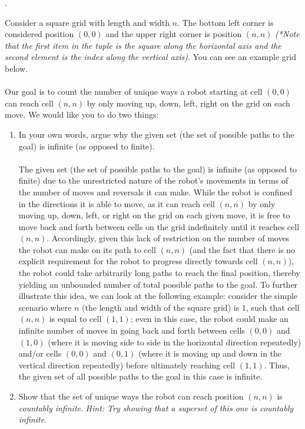 \documentclass[12pt]{article}
\newcounter{quesnum}
\newcommand{\question}[2][??]{
\begin{list}{\labelitemi}{\leftmargin=2em}
\item [\arabic{quesnum}.] {} {#2}
\end{list}
\addtocounter{quesnum}{1}
}
\begin{document}
\vspace{12pt}



\question[3]{
Consider a square grid with length and width $n$. The bottom left corner is considered position $(0,0)$ and the upper right corner is position $(n,n)$ \emph{(*Note that the first item in the tuple is the square along the horizontal axis and the second element is the index along the vertical axis)}. You can see an example grid below.\\
\\
Our goal is to count the number of unique ways a robot starting at cell $(0,0)$ can reach cell $(n,n)$ by only moving up, down, left, right on the grid on each move. We would like you to do two things:

\begin{enumerate}
	\item In your own words, argue why the given set (the set of possible paths to the goal) is infinite (as opposed to finite).\\
\\
 The given set (the set of possible paths to the goal) is infinite (as opposed to finite) due to the unrestricted nature of the robot's movements in terms of the number of moves and reversals it can make. While the robot is confined in the directions it is able to move, as it can reach cell $(n,n)$ by only moving up, down, left, or right on the grid on each given move, it is free to move back and forth between cells on the grid indefinitely until it reaches cell $(n,n)$. Accordingly, given this lack of restriction on the number of moves the robot can make on its path to cell $(n,n)$ (and the fact that there is no explicit requirement for the robot to progress directly towards cell $(n,n)$), the robot could take arbitrarily long paths to reach the final position, thereby yielding an unbounded number of total possible paths to the goal. To further illustrate this idea, we can look at the following example: consider the simple scenario where $n$ (the length and width of the square grid) is $1$, such that cell $(n,n)$ is equal to cell $(1,1)$; even in this case, the robot could make an infinite number of moves in going back and forth between cells $(0, 0)$ and $(1, 0)$ (where it is moving side to side in the horizontal direction repeatedly) and/or cells $(0, 0)$ and $(0, 1)$ (where it is moving up and down in the vertical direction repeatedly) before ultimately reaching cell $(1,1)$. Thus, the given set of all possible paths to the goal in this case is infinite.\\
 
	\item Show that the set of unique ways the robot can reach position $(n,n)$ is \emph{countably infinite}. \emph{Hint: Try showing that a superset of this one is countably infinite}.
\end{enumerate}
}
\end{document}
